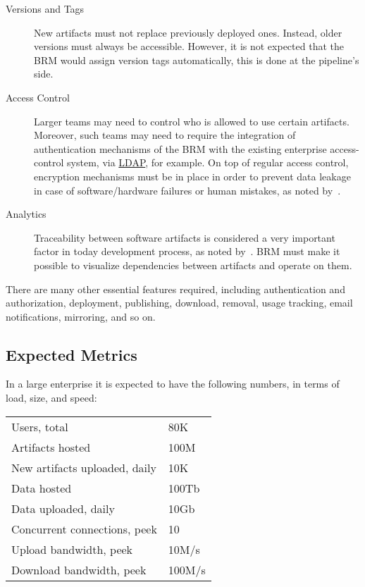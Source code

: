 \documentclass[12pt,oneside]{article}
\begin{document}
\begin{description}
  \item[Versions and Tags]
  New artifacts must not replace previously deployed ones.
  Instead, older versions must always be accessible. However,
  it is not expected that the BRM would assign version tags automatically,
  this is done at the pipeline's side.

  \item[Access Control]
  Larger teams may need to control who is allowed to use certain artifacts.
  Moreover, such teams may need to require the integration of authentication
  mechanisms of the BRM with the existing enterprise access-control system,
  via \href{https://en.wikipedia.org/wiki/Lightweight_Directory_Access_Protocol}{LDAP},
  for example. On top of regular access control, encryption mechanisms must
  be in place in order to prevent data leakage in case of software/hardware
  failures or human mistakes, as noted by~\textcite{paule2018}.

  \item[Analytics]
  Traceability between software artifacts is considered a very
  important factor in today development process, as noted by~\textcite{palihawadana2017}.
  BRM must make it possible to visualize dependencies between artifacts and
  operate on them.
\end{description}

There are many other essential features required, including
authentication and authorization, deployment, publishing,
download, removal, usage tracking, email notifications, mirroring,
and so on.

\subsection{Expected Metrics}
\label{ref:metrics}

In a large enterprise it is expected to have the following
numbers, in terms of load, size, and speed:

\begin{tabular}{ll}
Users, total & 80K \\
Artifacts hosted & 100M \\
New artifacts uploaded, daily & 10K \\
Data hosted & 100Tb \\
Data uploaded, daily & 10Gb \\
Concurrent connections, peek & 10 \\
Upload bandwidth, peek & 10M/s \\
Download bandwidth, peek & 100M/s \\
\end{tabular}
\end{document}
